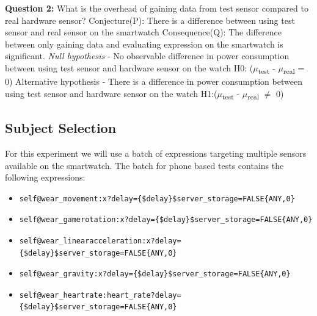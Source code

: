     \textbf{Question 2:}  What is the overhead of gaining data from test sensor compared to real hardware sensor?\newline
    Conjecture(P): There is  a difference between using test sensor and real sensor on the smartwatch\newline
    Consequence(Q): The difference between only gaining data and evaluating expression on the smartwatch is significant.\newline
    \textit{Null hypothesis} - No observable difference in power consumption between using test sensor and hardware sensor on the watch\newline
H0: ($\mu$\textsubscript{test} - $\mu$\textsubscript{real} = 0)\newline
    Alternative hypothesis - There is a difference in power consumption between using test sensor and hardware sensor on the watch\newline
H1:($\mu$\textsubscript{test} - $\mu$\textsubscript{real} $\neq$ 0)\newline

\subsection{Subject Selection}
For this experiment we will use a batch of expressions targeting multiple sensors available on the smartwatch.
The batch for phone based tests contains the following expressions:
\begin{itemize}
 \item \begin{verbatim}self@wear_movement:x?delay={$delay}$server_storage=FALSE{ANY,0}\end{verbatim}
 \item \begin{verbatim}self@wear_gamerotation:x?delay={$delay}$server_storage=FALSE{ANY,0}\end{verbatim}
 \item \begin{verbatim}self@wear_linearacceleration:x?delay={$delay}$server_storage=FALSE{ANY,0}\end{verbatim}
 \item \begin{verbatim}self@wear_gravity:x?delay={$delay}$server_storage=FALSE{ANY,0}\end{verbatim}
 \item \begin{verbatim}self@wear_heartrate:heart_rate?delay={$delay}$server_storage=FALSE{ANY,0}\end{verbatim}
\end{itemize}

